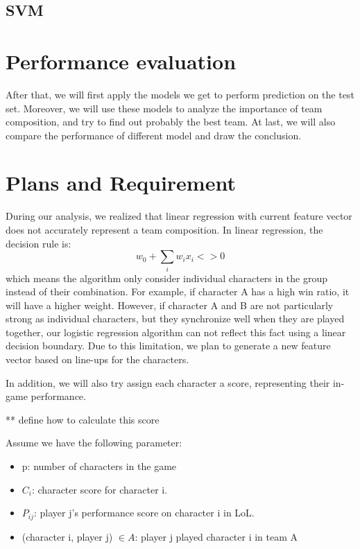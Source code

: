 \documentclass[conference]{IEEEtran}
\begin{document}
\subsection{SVM}


\section{Performance evaluation}

After that, we will first apply the models we get to perform prediction on the test set. Moreover, we will use these models to analyze the importance of team composition, and try to find out probably the best team. At last, we will also compare the performance of different model and draw the conclusion.


\section{Plans and Requirement}

During our analysis, we realized that linear regression with current feature vector does not accurately represent a team composition. In linear regression, the decision rule is:
\[
w_0 + \sum_i w_i x_i <>0
\]
which means the algorithm only consider individual characters in the group instead of their combination. For example, if character A has a high win ratio, it will have a higher weight. However, if character A and B are not particularly strong as individual characters, but they synchronize well when they are played together, our logistic regression algorithm can not reflect this fact using a linear decision boundary. Due to this limitation, we plan to generate a new feature vector based on line-ups for the characters.

In addition, we will also try assign each character a score, representing their in-game performance. 

** define how to calculate this score

Assume we have the following parameter:
\begin{itemize}
\item p: number of characters in the game
\item $C_i$: character score for character i. 
\item $P_{ij}$: player j's performance score on character i in LoL.
\item (character i, player j) $\in A$: player j played character i in team A

\end{itemize}
\end{document}
